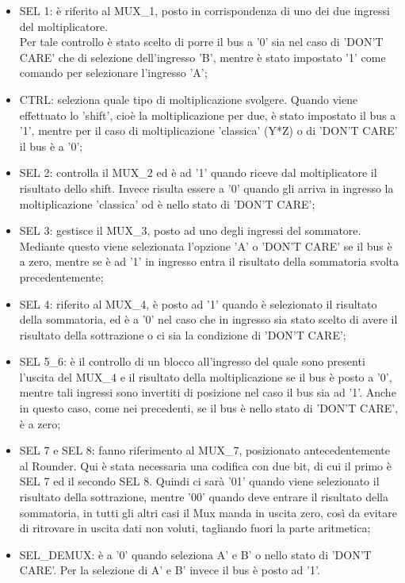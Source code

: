 \documentclass[a4paper, titlepage]{article}
\begin{document}
\begin{itemize}
    \item SEL 1: è riferito al MUX\_1, posto in corrispondenza di uno dei due ingressi del moltiplicatore.\\Per tale controllo è stato scelto di porre il bus a '0' sia nel caso di 'DON'T CARE' che di selezione dell'ingresso 'B', mentre è stato impostato '1' come comando per selezionare l'ingresso 'A';
    \item CTRL: seleziona quale tipo di moltiplicazione svolgere. Quando viene effettuato lo 'shift', cioè la moltiplicazione per due, è stato impostato il bus a '1', mentre per il caso di moltiplicazione 'classica' (Y*Z) o di 'DON'T CARE' il bus è a '0';
    \item SEL 2: controlla il MUX\_2 ed è ad '1' quando riceve dal moltiplicatore il risultato dello shift. Invece risulta essere a '0' quando gli arriva in ingresso la moltiplicazione 'classica' od è nello stato di 'DON'T CARE';
    \item SEL 3: gestisce il MUX\_3, posto ad uno degli ingressi del sommatore. Mediante questo viene selezionata l'opzione 'A' o 'DON'T CARE' se il bus è a zero, mentre se è ad '1' in ingresso entra il risultato della sommatoria svolta precedentemente;
    \item SEL 4: riferito al MUX\_4, è posto ad '1' quando è selezionato il risultato della sommatoria, ed è a '0' nel caso che in ingresso sia stato scelto di avere il risultato della sottrazione o ci sia la condizione di 'DON'T CARE';
    \item SEL 5\_6: è il controllo di un blocco all'ingresso del quale sono presenti l'uscita del MUX\_4 e il risultato della moltiplicazione se il bus è posto a '0', mentre tali ingressi sono invertiti di posizione nel caso il bus sia ad '1'. Anche in questo caso, come nei precedenti, se il bus è nello stato di 'DON'T CARE', è a zero;
    \item SEL 7 e SEL 8: fanno riferimento al MUX\_7, posizionato antecedentemente al Rounder. Qui è stata necessaria una codifica con due bit, di cui il primo è SEL 7 ed il secondo SEL 8. Quindi ci sarà '01' quando viene selezionato il risultato della sottrazione, mentre '00' quando deve entrare il risultato della sommatoria, in tutti gli altri casi il Mux manda in uscita zero, così da evitare di ritrovare in uscita dati non voluti, tagliando fuori la parte aritmetica;
    \item SEL\_DEMUX: è a '0' quando seleziona A' e B' o nello stato di 'DON'T CARE'. Per la selezione di A' e B' invece il bus è posto ad '1'.
\end{itemize} 
\end{document}
